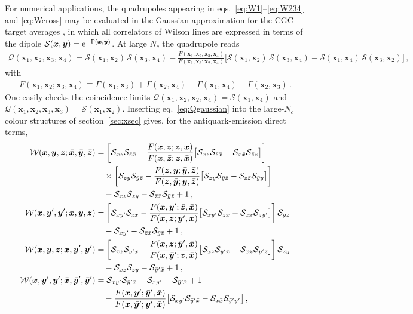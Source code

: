 \documentclass[11pt,a4paper]{article}
\newcommand{\calW}{\mathcal{W}}
\newcommand{\calQ}{\mathcal{Q}}
\newcommand{\calS}{\mathcal{S}}
\newcommand{\vx}{\bm{x}}
\newcommand{\vy}{\bm{y}}
\newcommand{\vz}{\bm{z}}
\newcommand{\vxb}{\bar{\bm{x}}}
\newcommand{\vyb}{\bar{\bm{y}}}
\newcommand{\vzb}{\bar{\bm{z}}}
\numberwithin{equation}{section}
\begin{document}
For numerical applications, the quadrupoles appearing in
eqs.~\eqref{eq:W1}--\eqref{eq:W234} and \eqref{eq:Wcross} may be evaluated in the Gaussian
approximation for the CGC target averages
\cite{Iancu:2011ns,Dumitru:2011vk,Dominguez:2011wm}, in which all correlators of Wilson lines
are expressed in terms of the dipole $\calS(\vx,\vy)={\rm e}^{-\Gamma(\vx,\vy)}$. At large
$N_c$ the quadrupole reads
\begin{align}
\label{eq:Qgaussian}
\calQ(\vx_{1},\vx_{2},\vx_{3},\vx_{4}) =
\calS(\vx_{1},\vx_{2})\,\calS(\vx_{3},\vx_{4})
- \frac{F(\vx_{1},\vx_{2};\vx_{3},\vx_{4})}{F(\vx_{1},\vx_{3};\vx_{2},\vx_{4})}
\Big[\calS(\vx_{1},\vx_{2})\,\calS(\vx_{3},\vx_{4})
-\calS(\vx_{1},\vx_{4})\,\calS(\vx_{3},\vx_{2})\Big]\,,
\end{align}
with
\begin{align}
F(\vx_{1},\vx_{2};\vx_{3},\vx_{4}) \equiv
\Gamma(\vx_{1},\vx_{3})+\Gamma(\vx_{2},\vx_{4})
-\Gamma(\vx_{1},\vx_{4})-\Gamma(\vx_{2},\vx_{3})\,.
\end{align}
One easily checks the coincidence limits $\calQ(\vx_1,\vx_2,\vx_2,\vx_4)=\calS(\vx_1,\vx_4)$
and $\calQ(\vx_1,\vx_2,\vx_3,\vx_3)=\calS(\vx_1,\vx_2)$. Inserting
eq.~\eqref{eq:Qgaussian} into the large-$N_c$ colour structures of
section~\ref{sec:xsec} gives, for the antiquark-emission direct terms,
\begin{align}
\calW(\vx,\vy,\vz;\vxb,\vyb,\vzb) & =
\left[\calS_{xz}\calS_{\bar z\bar x} - \frac{F(\vx,\vz;\vzb,\vxb)}{F(\vx,\vzb;\vz,\vxb)}
\big[\calS_{xz}\calS_{\bar z\bar x}-\calS_{x\bar x}\calS_{\bar zz}\big]\right]\notag\\
&\quad\times
\left[\calS_{zy}\calS_{\bar y\bar z} - \frac{F(\vz,\vy;\vyb,\vzb)}{F(\vz,\vyb;\vy,\vzb)}
\big[\calS_{zy}\calS_{\bar y\bar z}-\calS_{z\bar z}\calS_{\bar yy}\big]\right] \notag\\
&\quad - \calS_{xz}\calS_{zy} - \calS_{\bar z\bar x}\calS_{\bar y\bar z} +1\,,\notag\\
\calW(\vx,\vy',\vy';\vxb,\vyb,\vzb) & =
\left[\calS_{xy'}\calS_{\bar z\bar x} - \frac{F(\vx,\vy';\vzb,\vxb)}{F(\vx,\vzb;\vy',\vxb)}
\big[\calS_{xy'}\calS_{\bar z\bar x}-\calS_{x\bar x}\calS_{\bar zy'}\big]\right]
\calS_{\bar y\bar z} \notag\\
&\quad - \calS_{xy'} - \calS_{\bar z\bar x}\calS_{\bar y\bar z} +1\,,\notag\\
\calW(\vx,\vy,\vz;\vxb,\vyb',\vyb') & =
\left[\calS_{xz}\calS_{\bar y'\bar x} - \frac{F(\vx,\vz;\vyb',\vxb)}{F(\vx,\vyb';\vz,\vxb)}
\big[\calS_{xz}\calS_{\bar y'\bar x}-\calS_{x\bar x}\calS_{\bar y'z}\big]\right]
\calS_{zy} \notag\\
&\quad - \calS_{xz}\calS_{zy} - \calS_{\bar y'\bar x} +1\,,\notag\\
\calW(\vx,\vy',\vy';\vxb,\vyb',\vyb') & =
\calS_{xy'}\calS_{\bar y'\bar x} -\calS_{xy'} - \calS_{\bar y'\bar x} +1 \notag\\
&\quad - \frac{F(\vx,\vy';\vyb',\vxb)}{F(\vx,\vyb';\vy',\vxb)}
\big[\calS_{xy'}\calS_{\bar y'\bar x}-\calS_{x\bar x}\calS_{\bar y'y'}\big]\,,
\end{align}
\end{document}
